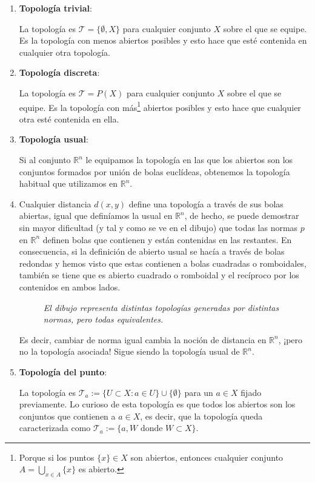 \begin{ej}
\begin{enumerate}
    \item \textbf{Topología trivial}: \label{ejemplos_topologia:first}
    
    La topología es $\mathcal{T} = \{\emptyset, X\}$ para cualquier conjunto $X$ sobre el que se equipe. Es la topología con menos abiertos posibles y esto hace que esté contenida en cualquier otra topología.
    \item \textbf{Topología discreta}:
    
    La topología es $\mathcal{T} = P\left( X \right)$ para cualquier conjunto $X$ sobre el que se equipe. Es la topología con más\footnote{Porque si los puntos $\{x\} \in X$ son abiertos, entonces cualquier conjunto $A = \bigcup_{x \in A} \{x\}$ es abierto.} abiertos posibles y esto hace que cualquier otra esté contenida en ella.
    \item \textbf{Topología usual}:
    
    Si al conjunto $\mathbb{R}^n$ le equipamos la topología en las que los abiertos son los conjuntos formados por unión de bolas euclídeas, obtenemos la topología habitual que utilizamos en $\mathbb{R}^n$.
    
    \item Cualquier distancia $d(x,y)$ define una topología a través de sus bolas abiertas, igual que definíamos la usual en $\mathbb{R}^n$, de hecho, se puede demostrar sin mayor dificultad (y tal y como se ve en el dibujo) que todas las normas $p$ en $\mathbb{R}^n$ definen bolas que contienen y están contenidas en las restantes. En consecuencia, si la definición de abierto usual se hacía a través de bolas redondas y hemos visto que estas contienen a bolas cuadradas o romboidales, también se tiene que es abierto cuadrado o romboidal y el recíproco por los contenidos en ambos lados.
    \begin{figure}[H]
        \centering
        \caption{\textit{El dibujo representa distintas topologías generadas por distintas normas, pero todas equivalentes.}}
        \label{fig:normas-topología}
    \end{figure}

    Es decir, cambiar de norma igual cambia la noción de distancia en $\mathbb{R}^n$, ¡pero no la topología asociada! Sigue siendo la topología usual de $\mathbb{R}^n$.
    
    \item \textbf{Topología del punto}:
    
    La topología es $\mathcal{T}_a := \{U \subset X: a \in U\} \cup \{\emptyset\}$ para un $a\in X$ fijado previamente. Lo curioso de esta topología es que todos los abiertos son los conjuntos que contienen a $a\in X$, es decir, que la topología queda caracterizada como $\mathcal{T}_a := \{{a, W} \text{ donde }W\subset X\}$.
\end{enumerate}
\end{ej}

